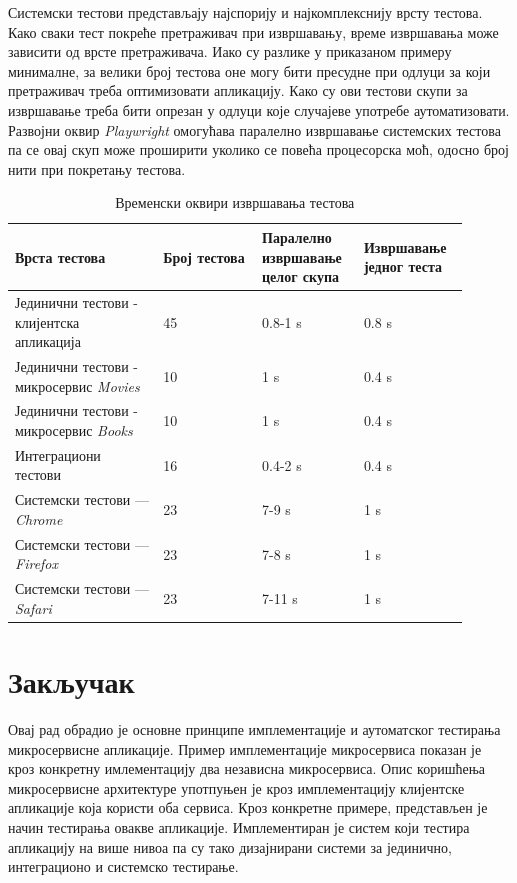 \documentclass[12pt,oneside]{memoir}
\begin{document}
Системски тестови представљају најспорију и најкомплекснију врсту тестова. Како сваки тест покреће претраживач при извршавању, време извршавања може зависити од врсте претраживача. Иако су разлике у приказаном примеру минималне, за велики број тестова оне могу бити пресудне при одлуци за који претраживач треба оптимизовати апликацију. Како су ови тестови скупи за извршавање треба бити опрезан у одлуци које случајеве употребе аутоматизовати.
Развојни оквир \textit{Playwright} омогућава паралелно извршавање системских тестова па се овај скуп може проширити уколико се повећа процесорска моћ, одосно број нити при покретању тестова.




\begin{table}
\label{tbl:vreme}
\caption{Временски оквири извршавања тестова}
\begin{tabular}{|p{0.3\linewidth} p{0.2\linewidth} p{0.2\linewidth} p{0.2\linewidth}|}
\hline
 \textbf{Врста тестова} & \textbf{Број тестова} &\textbf{Паралелно извршавање целог скупа} & \textbf{Извршавање једног теста} \\ [0.5ex] 
 \hline
 Јединични тестови - клијентска апликација & 45 & 0.8-1 s & 0.8 s\\ 
  \hline
 Јединични тестови - микросервис \textit{Movies} & 10 & 1 s & 0.4 s\\ 
  \hline
 Јединични тестови - микросервис \textit{Books} & 10 & 1 s & 0.4 s\\ 
 \hline
 Интеграциони тестови & 16 & 0.4-2 s & 0.4 s \\
 \hline
 Системски тестови --- \textit{Chrome} & 23 & 7-9 s & 1 s \\
  \hline
 Системски тестови  --- \textit{Firefox} & 23 & 7-8 s & 1 s \\
  \hline
 Системски тестови --- \textit{Safari} & 23 & 7-11 s & 1 s \\
 \hline
\end{tabular}
\end{table}

\chapter{Закључак}
\label{chp:zakljucak}

Овај рад обрадио је основне принципе имплементације и аутоматског тестирања микросервисне апликације. Пример имплементације микросервиса показан је кроз конкретну имлементацију два независна микросервиса. Опис коришћења микросервисне архитектуре употпуњен је кроз имплементацију клијентске апликације која користи оба сервиса. Кроз конкретне примере, представљен је начин тестирања овакве апликације. Имплементиран је систем који тестира апликацију на више нивоа па су тако дизајнирани системи за јединично, интеграционо и системско тестирање.
\end{document}

